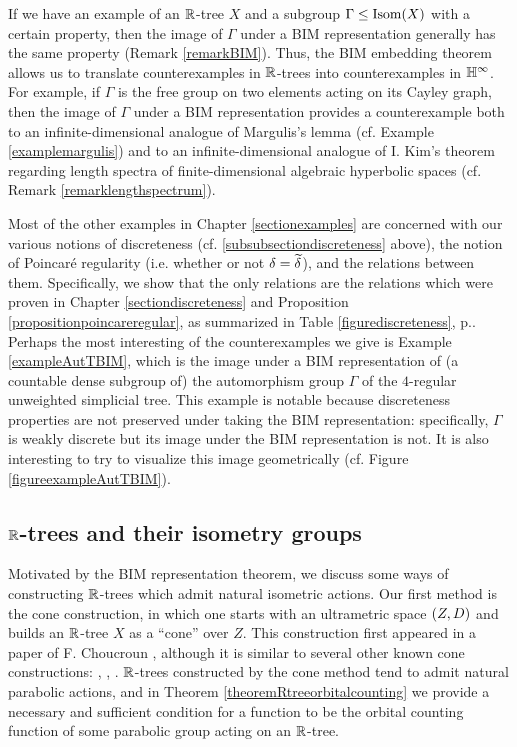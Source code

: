 If we have an example of an $\R$-tree $X$ and a subgroup $\Gamma\leq\operatorname{Isom}(X)$ with a certain property, then the image of $\Gamma$ under a BIM representation generally has the same property (Remark \ref{remarkBIM}). Thus, the BIM embedding theorem allows us to translate counterexamples in $\R$-trees into counterexamples in $\H^\infty$. For example, if $\Gamma$ is the free group on two elements acting on its Cayley graph, then the image of $\Gamma$ under a BIM representation provides a counterexample both to an infinite-dimensional analogue of Margulis's lemma (cf. Example \ref{examplemargulis}) and to an infinite-dimensional analogue of I. Kim's theorem regarding length spectra of finite-dimensional algebraic hyperbolic spaces (cf. Remark \ref{remarklengthspectrum}).

Most of the other examples in Chapter \ref{sectionexamples} are concerned with our various notions of discreteness (cf. \6\ref{subsubsectiondiscreteness} above), the notion of Poincar\'e regularity (i.e. whether or not $\delta = \widetilde\delta$), and the relations between them. Specifically, we show that the only relations are the relations which were proven in Chapter \ref{sectiondiscreteness} and Proposition \ref{propositionpoincareregular}, as summarized in Table \ref{figurediscreteness}, p.\pageref{figurediscreteness}. Perhaps the most interesting of the counterexamples we give is Example \ref{exampleAutTBIM}, which is the image under a BIM representation of (a countable dense subgroup of) the automorphism group $\Gamma$ of the $4$-regular unweighted simplicial tree. This example is notable because discreteness properties are not preserved under taking the BIM representation: specifically, $\Gamma$ is weakly discrete but its image under the BIM representation is not. It is also interesting to try to visualize this image geometrically (cf. Figure \ref{figureexampleAutTBIM}).

\subsection{$\R$-trees and their isometry groups}

Motivated by the BIM representation theorem, we discuss some ways of constructing $\R$-trees which admit natural isometric actions. Our first method is the cone construction, in which one starts with an ultrametric space $(Z,D)$ and builds an $\R$-tree $X$ as a ``cone'' over $Z$. This construction first appeared in a paper of F. Choucroun \cite{Choucroun}, although it is similar to several other known cone constructions: \cite[1.8.A.(b)]{Gromov3}, \cite{TrotsenkoVaisala}, \cite[]{BonkSchramm}. $\R$-trees constructed by the cone method tend to admit natural parabolic actions, and in Theorem \ref{theoremRtreeorbitalcounting} we provide a necessary and sufficient condition for a function to be the orbital counting function of some parabolic group acting on an $\R$-tree.

